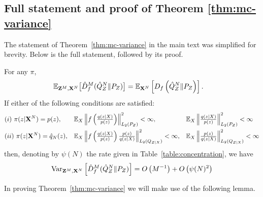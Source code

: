 \subsection{Full statement and proof of Theorem \ref{thm:mc-variance}}\label{appendix:full-statment-proof-mc}

The statement of Theorem~\ref{thm:mc-variance} in the main text was simplified for brevity. 
Below is the full statement, followed by its proof.



\begin{theorem}
For any $\pi$,
\begin{align*}
    \mathbb{E}_{\mathbf{Z}^M, \mathbf{X}^N} \bigl[\hat{D}^M_f( \hat{Q}_Z^N \| P_Z)\bigr]
    &=\mathbb{E}_{\mathbf{X}^N} \left[ D_f\left( \hat{Q}^N_Z \| P_Z \right)\right].
\end{align*}
If either of the following conditions are satisfied:
\begin{align*}
&(i) \ \pi(z|\mathbf{X}^N) = p(z),& 
&\textstyle{\mathbb{E}_X \left\| f\left( \frac{q(z|X)}{p(z)}\right) \right\|^2_{L_2(P_Z)}  < \infty,}&
&\textstyle{\mathbb{E}_X \left\| \frac{q(z|X)}{p(z)} \right\|^2_{L_2(P_Z)} < \infty} \\
&(ii) \  \pi(z | \mathbf{X}^N) = \hat{q}_N(z),&
&\textstyle{\mathbb{E}_X \left\| f\left( \frac{q(z|X)}{p(z)}\right)\frac{p(z)}{q(z|X)}\right\|^2_{L_2(Q_{Z|X})} < \infty,}&
&\textstyle{\mathbb{E}_X \left\| \frac{p(z)}{q(z|X)} \right\|^2_{L_2(Q_{Z|X})} < \infty}
\end{align*}
then, denoting by $\psi(N)$ the rate given in Table~\ref{table:concentration}, we have
\begin{align*}
    \text{Var}_{\mathbf{Z}^M, \mathbf{X}^N} \left[\hat{D}^M_f( \hat{Q}_Z^N \| P_Z)  \right] = 
    O\left(M^{-1}\right) + O\left( \psi(N)^2 \right) 
\end{align*}
\end{theorem}

In proving Theorem~\ref{thm:mc-variance} we will make use of the following lemma.

